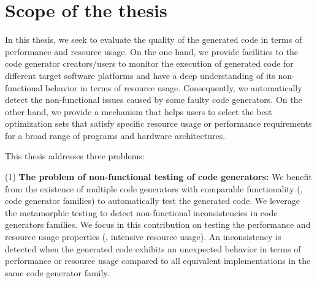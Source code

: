 



\section{Scope of the thesis}

In this thesis, we seek to evaluate the quality of the generated code in terms of performance and resource usage.
On the one hand, we provide facilities to the code generator creators/users to monitor the execution of generated code for different target software platforms and have a deep understanding of its non-functional behavior in terms of resource usage. Consequently, we automatically detect the non-functional issues caused by some faulty code generators. 
On the other hand, we provide a mechanism that helps users to select the best optimization sets that satisfy specific resource usage or performance requirements for a broad range of programs and hardware architectures.

This thesis addresses three problems: 
	
	(1) \textbf{The problem of non-functional testing of code generators:} We benefit from the existence of multiple code generators with comparable functionality (\ie, code generator families) to automatically test the generated code. We leverage the metamorphic testing\cite{chen1998metamorphic} to detect non-functional inconsistencies in code generators families.
	We focus in this contribution on testing the performance and resource usage properties (\eg, intensive resource usage).
	An inconsistency is detected when the generated code exhibits an unexpected behavior in terms of performance or resource usage compared to all equivalent implementations in the same code generator family.
	
